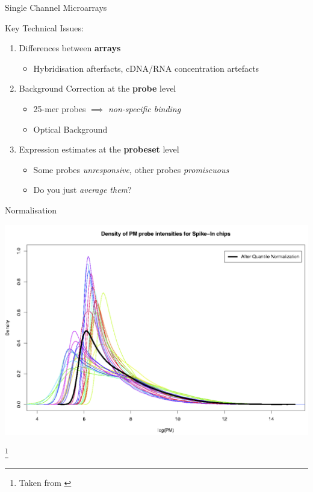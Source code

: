 \documentclass[aspectratio=169,11pt]{beamer}
\newcommand\blfootnote[1]{%
  \begingroup
  \renewcommand\thefootnote{}\footnote{#1}%
  \addtocounter{footnote}{-1}%
  \endgroup
}
\begin{document}
\begin{frame}{Single Channel Microarrays}

	Key Technical Issues: 

	\begin{enumerate}
		\item Differences between \textbf{arrays}
		\begin{itemize}
			\item Hybridisation afterfacts, cDNA/RNA concentration artefacts
		\end{itemize}
		\item Background Correction at the \textbf{probe} level
		\begin{itemize}
			\item 25-mer probes $\implies$ \textit{non-specific binding}
			\item Optical Background
		\end{itemize}
		\item Expression estimates at the \textbf{probeset} level
		\begin{itemize}
			\item Some probes \textit{unresponsive}, other probes \textit{promiscuous}
			\item Do you just \textit{average them}?
		\end{itemize}
	\end{enumerate}
	
\end{frame}

\begin{frame}{Normalisation}

	\begin{center}
		\includegraphics[scale=0.12]{figures/quantileNorm.png} 
	\end{center}

\blfootnote{Taken from \cite{pmid12538238}}	

\end{frame}
\end{document}

